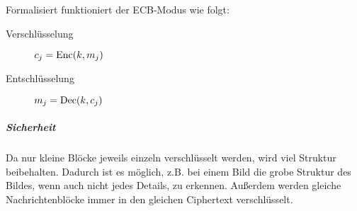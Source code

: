                     Formalisiert funktioniert der ECB-Modus wie folgt:
                    \begin{description}
                    	\item[Verschlüsselung] \( c_j = \textrm{Enc}(k, m_j) \)
                    	\item[Entschlüsselung] \( m_j = \textrm{Dec}(k, c_j) \)
                    \end{description}
                
					\subparagraph{Sicherheit}
						Da nur kleine Blöcke jeweils einzeln verschlüsselt werden, wird viel Struktur beibehalten. Dadurch ist es möglich, z.B. bei einem Bild die grobe Struktur des Bildes, wenn auch nicht jedes Details, zu erkennen. Außerdem werden gleiche Nachrichtenblöcke immer in den gleichen Ciphertext verschlüsselt.

